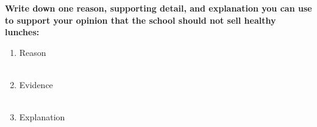 \documentclass[12pt]{article}
\begin{document}
\begin{tcolorbox}[colframe=black!60, colback=white, 
coltitle=black, colbacktitle=black!15, fonttitle=\bfseries\Large, 
title=Guided Practice, halign title=center, left=10pt, right=10pt, top=10pt, bottom=15pt]
\textbf{Write down one reason, supporting detail, and explanation you can use to support your opinion that the school should not sell healthy lunches:}
\begin{enumerate}[itemsep=3em] %
    \item Reason
    \\[0.8cm] \underline{\hspace{14.3cm}}  
    \\[0.8cm] \underline{\hspace{14.3cm}} 
    \item Evidence
     \\[0.8cm] \underline{\hspace{14.3cm}}  
    \\[0.8cm] \underline{\hspace{14.3cm}} 
    \item Explanation
       \\[0.8cm] \underline{\hspace{14.3cm}}  
    \\[0.8cm] \underline{\hspace{14.3cm}} 

\vspace{1.5em}\end{enumerate}
\end{tcolorbox}
\vspace{2em}
\end{document}
